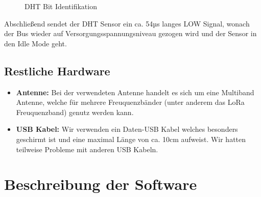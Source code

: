 \begin{center}
	\begin{figure}[h]
	 
	 \noindent{}
	 \caption[DHT Bit Identifikation]{DHT Bit Identifikation}
	 \label{fig:dhtbits}
	\end{figure}
\end{center}

Abschließend sendet der DHT Sensor ein ca. 54µs langes LOW Signal, wonach der Bus wieder auf Versorgungsspannungsniveau gezogen wird und der Sensor in den Idle Mode geht.



\newpage

\subsection{Restliche Hardware} \label{Restliche Hardware}


\begin{itemize} 
	\item \textbf{Antenne:}  Bei der verwendeten Antenne handelt es sich um eine Multiband Antenne, welche für mehrere Freuquenzbänder (unter anderem das LoRa Freuquenzband) genutz werden kann.
	\item \textbf{USB Kabel:} Wir verwenden ein Daten-USB Kabel welches besonders geschirmt ist und eine maximal Länge von ca. 10cm aufweist. Wir hatten teilweise Probleme mit anderen USB Kabeln.
\end{itemize}



\section{Beschreibung der Software} \label{Software}

